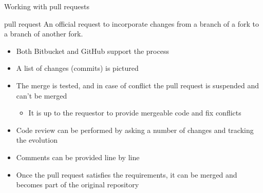 \documentclass[presentation]{beamer}
\begin{document}
\begin{frame}{Working with pull requests}
    \begin{block}{pull request}
        An official request to incorporate changes from a branch of a fork to a branch of another fork.
    \end{block}
    \begin{itemize}
        \item Both Bitbucket and GitHub support the process
        \item A list of changes (commits) is pictured
        \item The merge is tested, and in case of conflict the pull request is suspended and can't be merged
        \begin{itemize}
            \item It is up to the requestor to provide mergeable code and fix conflicts
        \end{itemize}
        \item Code review can be performed by asking a number of changes and tracking the evolution
        \item Comments can be provided line by line
        \item Once the pull request satisfies the requirements, it can be merged and becomes part of the original repository
    \end{itemize}
\end{frame}


\section*{\refname}
\begin{frame}[allowframebreaks]
  \frametitle{\refname}
  \scriptsize
  
  
\end{frame}
\section*{\refname}
\end{document}
